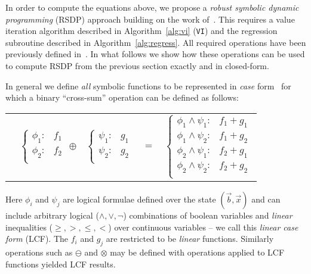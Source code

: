 In order to compute the equations above, we propose a \emph{robust
symbolic dynamic programming} (RSDP) approach building on the work
of~\cite{sdp_aaai,sanner_uai11}.  This requires a value iteration
algorithm described in Algorithm~\ref{alg:vi} (\texttt{VI}) and the
regression subroutine described in Algorithm~\ref{alg:regress}.  All
required operations have been previously defined
in~\cite{sdp_aaai,sanner_uai11}.  In what follows we show how these
operations can be used to compute RSDP from the previous section
exactly and in closed-form.

In general we define \emph{all} symbolic functions to be represented
in \emph{case} form~\cite{fomdp} for which a binary ``cross-sum'' operation
can be defined as follows:
{\footnotesize 
\begin{center}
\begin{tabular}{r c c c l}
&
\hspace{-6mm} 
  $\begin{cases}
    \phi_1: & f_1 \\ 
    \phi_2: & f_2 \\ 
  \end{cases}$
$\oplus$
&
\hspace{-4mm}
  $\begin{cases}
    \psi_1: & g_1 \\ 
    \psi_2: & g_2 \\ 
  \end{cases}$
&
\hspace{-2mm} 
$ = $
&
\hspace{-2mm}
  $\begin{cases}
  \phi_1 \wedge \psi_1: & f_1 + g_1 \\ 
  \phi_1 \wedge \psi_2: & f_1 + g_2 \\ 
  \phi_2 \wedge \psi_1: & f_2 + g_1 \\ 
  \phi_2 \wedge \psi_2: & f_2 + g_2 \\ 
  \end{cases}$
\end{tabular}
\end{center}
}
\normalsize
Here $\phi_i$ and $\psi_j$ are logical formulae defined over the state
$(\vec{b},\vec{x})$ and can include arbitrary logical
($\land,\lor,\neg$) combinations of boolean variables
and \emph{linear} inequalities ($\geq,>,\leq,<$) over continuous
variables -- we call this \emph{linear case form} (LCF).  The $f_i$
and $g_j$ are restricted to be \emph{linear} functions.  Similarly
operations such as $\ominus$ and $\otimes$ may be defined with operations
applied to LCF functions yielded LCF results.

